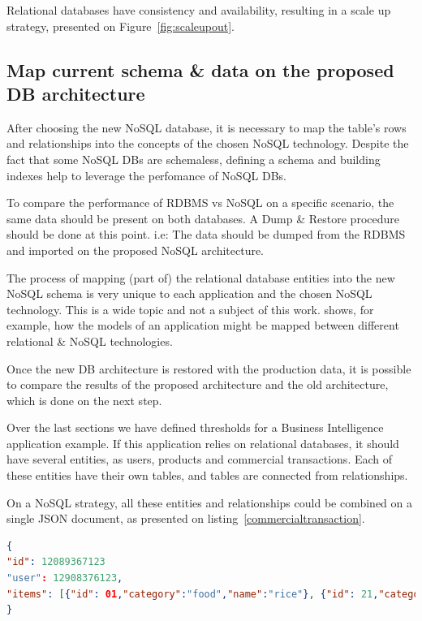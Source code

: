 Relational databases have consistency and availability, resulting in a scale up strategy, presented on Figure~\ref{fig:scaleupout}.

\subsection{Map current schema \& data on the proposed DB architecture}
After choosing the new NoSQL database, it is necessary to map the table's rows and relationships into the concepts of the chosen NoSQL technology. Despite the fact that some NoSQL DBs are schemaless, defining a schema and building indexes help to leverage the perfomance of NoSQL DBs.

To compare the performance of RDBMS vs NoSQL on a specific scenario, the same data should be present on both databases. A Dump \& Restore procedure should be done at this point. i.e: The data should be dumped from the RDBMS and imported on the proposed NoSQL architecture.

The process of mapping (part of) the relational database entities into the new NoSQL schema is very unique to each application and the chosen NoSQL technology. This is a wide topic and not a subject of this work. \cite{bahl2014mysql} shows, for example, how the models of an application might be mapped between different relational \& NoSQL technologies.

Once the new DB architecture is restored with the production data, it is possible to compare the results of the proposed architecture and the old architecture, which is done on the next step.

Over the last sections we have defined thresholds for a Business Intelligence application example. If this application relies on relational databases, it should have several entities, as users, products and commercial transactions. Each of these entities have their own tables, and tables are connected from relationships. 

On a NoSQL strategy, all these entities and relationships could be combined on a single JSON document, as presented on listing~\ref{commercialtransaction}. 

\begin{lstlisting}[language=json,firstnumber=1, caption=BI application commercial transaction represented as a single document., label=commercialtransaction]
{
"id": 12089367123
"user": 12908376123,
"items": [{"id": 01,"category":"food","name":"rice"}, {"id": 21,"category":"drinks","name":"soda"}]
}
\end{lstlisting}
